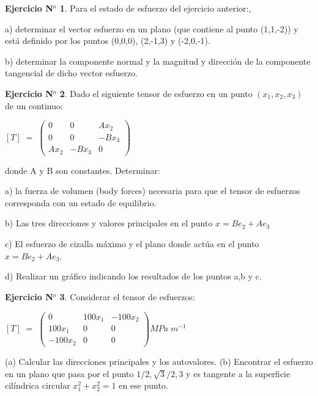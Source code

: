 \documentclass[12pt,a4paper]{article}
\theoremstyle{definition}
\newtheorem{theorem}{Ejercicio N$^o$}
\begin{document}
\bigskip

\begin{theorem}
Para el estado de esfuerzo del ejercicio anterior:, 

\noindent a) determinar el vector esfuerzo en un plano (que contiene al punto (1,1,-2)) y está definido por los puntos (0,0,0), (2,-1,3) y (-2,0,-1).

\noindent b) determinar la componente normal y la magnitud y dirección de la componente tangencial de dicho vector esfuerzo.
\end{theorem}


\bigskip


\begin{theorem}
Dado el siguiente tensor de esfuerzo en un punto $(x_1,x_2,x_3)$ de un continuo:

\hspace*{4cm}$[T] \; = \;
\left( \begin{matrix}
0 & 0 & Ax_2 \\
0 & 0 & -Bx_3 \\
Ax_2 & -Bx_3 & 0 
\end{matrix} \right)
$

donde A y B son constantes. Determinar:

\noindent a) la fuerza de volumen (body forces) necesaria para que el tensor de esfuerzos corresponda con un estado de equilibrio.

\noindent b) Las tres direcciones y valores principales en el punto $x=Be_2+Ae_3$

\noindent c) El esfuerzo de cizalla máximo y el plano donde actúa en el punto $x=Be_2+Ae_3$.

\noindent d) Realizar un gráfico indicando los resultados de los puntos a,b y c.
\end{theorem}


\bigskip

\begin{theorem}
Considerar el tensor de esfuerzos:
\begin{center}
$[T] \; = \;
\left( \begin{matrix}
0 & 100 x_1 & -100x_2 \\
100 x_1 & 0 & 0 \\
-100x_2 & 0 & 0 
\end{matrix} \right) MPa \; m^{-1}
$
\end{center}

(a) Calcular las direcciones principales y los autovalores. (b) Encontrar el esfuerzo en un plano que pasa por el punto $1/2,\sqrt{3}/2, 3$ y es tangente a la superficie cilíndrica circular $x_1^2+x_2^2=1$ en ese punto. 


\end{theorem}
\end{document}
